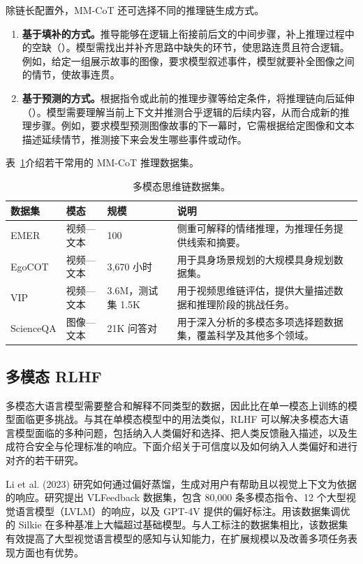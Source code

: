 除链长配置外，MM-CoT 还可选择不同的推理链生成方式。
\begin{enumerate}
\item \textbf{基于填补的方式。}推导能够在逻辑上衔接前后文的中间步骤，补上推理过程中的空缺（）。模型需找出并补齐思路中缺失的环节，使思路连贯且符合逻辑。例如，给定一组展示故事的图像，要求模型叙述事件，模型就要补全图像之间的情节，使故事连贯。
\item \textbf{基于预测的方式。}根据指令或此前的推理步骤等给定条件，将推理链向后延伸（）。模型需要理解当前上下文并推测合乎逻辑的后续内容，从而合成新的推理步骤。例如，要求模型预测图像故事的下一幕时，它需根据给定图像和文本描述延续情节，推测接下来会发生哪些事件或动作。
\end{enumerate}
表~\ref{tab:ch09-mm-cot}介绍若干常用的 MM-CoT 推理数据集。

\begin{table}[!htbp]
\centering\small
\caption{多模态思维链数据集。}
\label{tab:ch09-mm-cot}
\setlength{\tabcolsep}{3pt}
\begin{tabularx}{\linewidth}{@{}p{19mm}p{18mm}p{24mm}>{\raggedright\arraybackslash}X@{}}
\toprule
数据集 & 模态 & 规模 & 说明\\
\midrule
EMER & 视频—文本 & 100 & 侧重可解释的情绪推理，为推理任务提供线索和摘要。\\
EgoCOT & 视频—文本 & 3,670 小时 & 用于具身场景规划的大规模具身规划数据集。\\
VIP & 视频—文本 & 3.6M，测试集 1.5K & 用于视频思维链评估，提供大量描述数据和推理阶段的挑战任务。\\
ScienceQA & 图像—文本 & 21K 问答对 & 用于深入分析的多模态多项选择题数据集，覆盖科学及其他多个领域。\\
\bottomrule
\end{tabularx}
\end{table}

\subsection{多模态 RLHF}
多模态大语言模型需要整合和解释不同类型的数据，因此比在单一模态上训练的模型面临更多挑战。与其在单模态模型中的用法类似，RLHF 可以解决多模态大语言模型面临的多种问题，包括纳入人类偏好和选择、把人类反馈融入描述，以及生成符合安全与伦理标准的响应。下面介绍关于可信度以及如何纳入人类偏好和进行对齐的若干研究。

\begin{practicaltip}
Li et al. (2023) 研究如何通过偏好蒸馏，生成对用户有帮助且以视觉上下文为依据的响应。研究提出 VLFeedback 数据集，包含 80,000 条多模态指令、12 个大型视觉语言模型（LVLM）的响应，以及 GPT-4V 提供的偏好标注。用该数据集调优的 Silkie 在多种基准上大幅超过基础模型。与人工标注的数据集相比，该数据集有效提高了大型视觉语言模型的感知与认知能力，在扩展规模以及改善多项任务表现方面也有优势。
\end{practicaltip}

